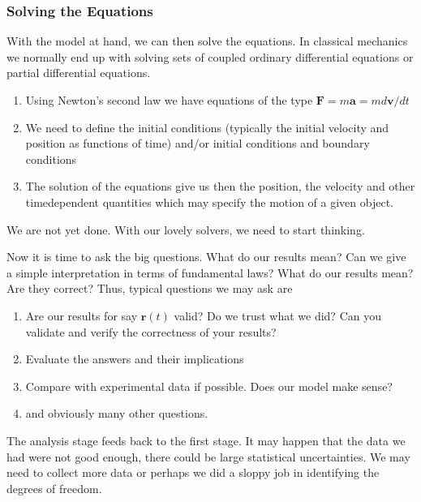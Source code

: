 \documentclass[letterpaper,10pt,english]{sphinxmanual}
\begin{document}
\subsubsection{Solving the Equations}
\label{\detokenize{chapter3:solving-the-equations}}
With the model at hand, we can then solve the equations. In classical mechanics we normally end up  with solving sets of coupled ordinary differential equations or partial differential equations.
\begin{enumerate}
%
\item {} 
Using Newton’s second law we have equations of the type \(\boldsymbol{F}=m\boldsymbol{a}=md\boldsymbol{v}/dt\)

\item {} 
We need to  define the initial conditions (typically the initial velocity and position as functions of time) and/or initial conditions and boundary conditions

\item {} 
The solution of the equations give us then the position, the velocity and other time\sphinxhyphen{}dependent quantities which may specify the motion of a given object.

\end{enumerate}

We are not yet done. With our lovely solvers, we need to start thinking.

Now it is time to ask the big questions. What do our results mean? Can we give a simple interpretation in terms of fundamental laws?  What do our results mean? Are they correct?
Thus, typical questions we may ask are
\begin{enumerate}
%
\item {} 
Are our results for say \(\boldsymbol{r}(t)\) valid?  Do we trust what we did?  Can you validate and verify the correctness of your results?

\item {} 
Evaluate the answers and their implications

\item {} 
Compare with experimental data if possible. Does our model make sense?

\item {} 
and obviously many other questions.

\end{enumerate}

The analysis stage feeds back to the first stage. It may happen that
the data we had were not good enough, there could be large statistical
uncertainties. We may need to collect more data or perhaps we did a
sloppy job in identifying the degrees of freedom.
\end{document}
